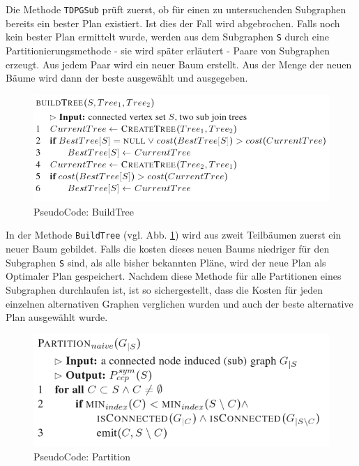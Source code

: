 Die Methode \texttt{TDPGSub} prüft zuerst, ob für einen zu untersuchenden Subgraphen bereits ein bester Plan existiert. Ist dies der Fall wird abgebrochen. Falls noch kein bester Plan ermittelt wurde, werden aus dem Subgraphen \texttt{S} durch eine Partitionierungsmethode - sie wird später erläutert - Paare von Subgraphen erzeugt. Aus jedem Paar wird ein neuer Baum erstellt. Aus der Menge der neuen Bäume wird dann der beste ausgewählt und ausgegeben. 


\begin{figure}[ht]
  \centering
  \includegraphics[scale=0.4]{03_Regeln/00_media/BuildTree.png}
  \caption{PseudoCode: BuildTree}
  \label{BuildTree}
\end{figure}

In der Methode \texttt{BuildTree} (vgl. Abb. \ref{BuildTree}) wird aus zweit Teilbäumen zuerst ein neuer Baum gebildet. Falls die kosten dieses neuen Baums niedriger für den Subgraphen \texttt{S} sind,  als alle bisher bekannten Pläne, wird der neue Plan als Optimaler Plan gespeichert. Nachdem diese Methode für alle Partitionen eines Subgraphen durchlaufen ist, ist so sichergestellt, dass die Kosten für jeden einzelnen alternativen Graphen verglichen wurden und auch der beste alternative Plan ausgewählt wurde.

\begin{figure}[ht]
  \centering
  \includegraphics[scale=0.4]{03_Regeln/00_media/Partition.png}
  \caption{PseudoCode: Partition}
  \label{Partition}
\end{figure}


